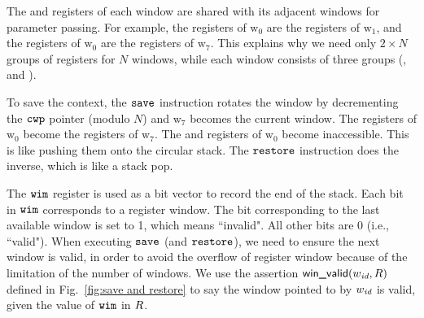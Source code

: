 The \inRN{} and \outRN{} registers of each window are shared
with its adjacent windows for parameter passing.
For example, the \inRN{} registers of $\text{w}_0$
are the \outRN{} registers of $\text{w}_1$,
and the \outRN{} registers of $\text{w}_0$
are the \inRN{} registers of $\text{w}_7$.
This explains
why we need only $2\times N$ groups of registers for
$N$ windows, while each window consists of
three groups (\outRN{}, \localRN{} and \inRN{}).

To save the context, the $\texttt{save}$ instruction
rotates the window by decrementing the $\texttt{cwp}$ pointer
(modulo $N$)
and $\text{w}_7$ becomes the current window. The \outRN{}
registers of $\text{w}_0$ become
the \inRN{} registers of $\text{w}_7$.
The \inRN{} and \localRN{} registers of $\text{w}_0$
become inaccessible.
This is like pushing them
onto the circular stack.
The $\texttt{restore}$ instruction does the inverse, which is like
a stack pop.

The $\texttt{wim}$ register is used as a bit vector to record the
end of the stack. Each bit in $\texttt{wim}$ corresponds to a
register window. The bit corresponding to the last available
window is set to 1, which means ``invalid". All other bits
are 0 (i.e., ``valid").
When executing $\texttt{save}$ (and $\texttt{restore}$), we need to ensure
the next window is valid, in order to avoid the overflow
of register window because of the limitation of the number
of windows. We use the assertion $\textsf{win\_valid}{(}w_{\textit{id}}, R)$ defined
in Fig.~\ref{fig:save and restore} to say the
window pointed to by $w_{\textit{id}}$ is valid, given the value of
$\texttt{wim}$ in $R$.

